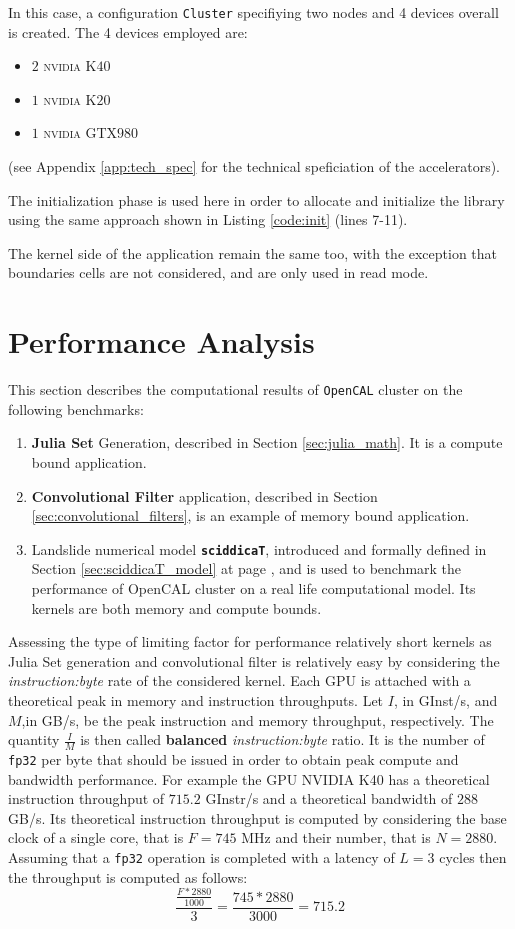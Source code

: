In this case, a configuration \texttt{Cluster} specifiying two nodes and 4 devices overall is created. The 4 devices employed are: 
\begin{itemize}
	\item $2$ \textsc{nvidia} K$40$
	\item $1$ \textsc{nvidia} K$20$
	\item $1$ \textsc{nvidia} GTX$980$
\end{itemize}
(see Appendix \ref{app:tech_spec} for the technical speficiation of the accelerators).

The initialization phase is used here in order to allocate and initialize the library using the same approach shown in Listing \ref{code:init} (lines 7-11).

The kernel side of the application remain the same too, with the exception that boundaries cells are not considered, and are only used in read mode. 

\section{Performance Analysis}
\label{sec:perfomance}
This section describes the computational results of \texttt{OpenCAL} cluster on the following benchmarks:

\begin{enumerate}
	\item \textbf{Julia Set} Generation, described in Section \ref{sec:julia_math}. It is a compute bound application.
	\item \textbf{Convolutional Filter} application, described in Section \ref{sec:convolutional_filters}, is an example of memory bound application.
	\item Landslide numerical model \texttt{\textbf{sciddicaT}}, introduced and formally defined in Section \ref{sec:sciddicaT_model} at page \pageref{sec:sciddicaT_model}, and is used to benchmark the performance of OpenCAL cluster on a real life computational model. Its kernels are both memory and compute bounds.
\end{enumerate}
Assessing the type of limiting factor for performance relatively short kernels as Julia Set generation and convolutional filter is relatively easy by considering the \textit{instruction:byte} rate of the considered kernel.
Each GPU is attached with a theoretical peak in memory and instruction throughputs\cite{Volkov:EECS-2016-143}.
Let $I$, in \si{GInst/s}, and $M$,in \si{GB/s}, be the peak instruction and memory throughput, respectively. The quantity $\frac{I}{M}$ is then called \textbf{balanced} \textit{instruction:byte} ratio. It is the number of \texttt{fp32} per byte that should be issued in order to obtain peak compute and bandwidth performance.
For example the GPU NVIDIA K40 has a theoretical instruction throughput of $715.2$ \si{GInstr/s} and a theoretical bandwidth of $288$ \si{GB/s}. 
Its theoretical instruction throughput is computed by considering the base clock of a single core, that is $F=745$ \si{MHz} and their number, that is $N=2880$. Assuming that a \texttt{fp32} operation is completed with a latency of $L=3$ cycles then the throughput is computed as follows:
\[
	\frac{\frac{F*2880}{1000}}{3} = \frac{745*2880}{3000} = 715.2
\]

